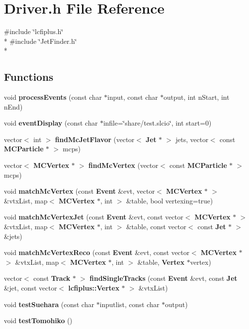 \section{Driver.\-h File Reference}
\label{Driver_8h}
{\ttfamily \#include \char`\"{}lcfiplus.\-h\char`\"{}}\\*
{\ttfamily \#include \char`\"{}Jet\-Finder.\-h\char`\"{}}\\*
\subsection*{Functions}
\begin{DoxyCompactItemize}
\item 
void {\bf process\-Events} (const char $\ast$input, const char $\ast$output, int n\-Start, int n\-End)
\item 
void {\bf event\-Display} (const char $\ast$infile=\char`\"{}share/test.\-slcio\char`\"{}, int start=0)
\item 
vector$<$ int $>$ {\bf find\-Mc\-Jet\-Flavor} (vector$<$ {\bf Jet} $\ast$ $>$ jets, vector$<$ const {\bf M\-C\-Particle} $\ast$ $>$ mcps)
\item 
vector$<$ {\bf M\-C\-Vertex} $\ast$ $>$ {\bf find\-Mc\-Vertex} (vector$<$ const {\bf M\-C\-Particle} $\ast$ $>$ mcps)
\item 
void {\bf match\-Mc\-Vertex} (const {\bf Event} \&evt, vector$<$ {\bf M\-C\-Vertex} $\ast$ $>$ \&vtx\-List, map$<$ {\bf M\-C\-Vertex} $\ast$, int $>$ \&table, bool vertexing=true)
\item 
void {\bf match\-Mc\-Vertex\-Jet} (const {\bf Event} \&evt, const vector$<$ {\bf M\-C\-Vertex} $\ast$ $>$ \&vtx\-List, map$<$ {\bf M\-C\-Vertex} $\ast$, int $>$ \&table, const vector$<$ const {\bf Jet} $\ast$ $>$ \&jets)
\item 
void {\bf match\-Mc\-Vertex\-Reco} (const {\bf Event} \&evt, const vector$<$ {\bf M\-C\-Vertex} $\ast$ $>$ \&vtx\-List, map$<$ {\bf M\-C\-Vertex} $\ast$, int $>$ \&table, {\bf Vertex} $\ast$vertex)
\item 
vector$<$ const {\bf Track} $\ast$ $>$ {\bf find\-Single\-Tracks} (const {\bf Event} \&evt, const {\bf Jet} \&jet, const vector$<$ {\bf lcfiplus\-::\-Vertex} $\ast$ $>$ \&vtx\-List)
\item 
void {\bf test\-Suehara} (const char $\ast$inputlist, const char $\ast$output)
\item 
void {\bf test\-Tomohiko} ()
\end{DoxyCompactItemize}


